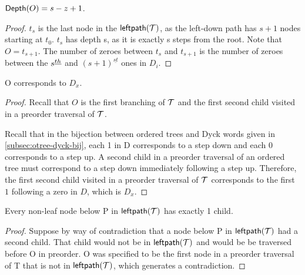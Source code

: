 \begin{remark} $\mathsf{Depth}{(O)}=s-z+1$. \label{re:o_depth_formula}
\end{remark} 
\begin{proof}


    $t_s$ is the last node in the $\mathsf{leftpath}{(\mathcal{\mathcal{T}})}$, as the left-down path has $s+1$ nodes starting at $t_0$. $t_s$ has depth s, as it is exactly s steps from the root.  Note that $O=t_{s+1}$.  The number of zeroes between $t_s$ and $t_{s+1}$ is the number of zeroes between the $s^{\underline{th}}$ and $(s+1)^{\underline{st}}$ ones in $D_i$.  

\end{proof} 
\begin{remark}O corresponds to $D_x$.
\end{remark}
\begin{proof}
    Recall that $O$ is the first branching of $\mathcal{T}$ and the first second child visited in a preorder traversal of $\mathcal{T}$.

    Recall that in the bijection between ordered trees and Dyck words given in \ref{subsec:otree-dyck-bij}, each 1 in D corresponds to a step down and each 0 corresponds to a step up.  A second child in a preorder traversal of an ordered tree must correspond to a step down immediately following a step up.  Therefore, the first second child visited in a preorder traversal of $\mathcal{T}$ corresponds to the first $1$ following a zero in $D$, which is $D_x$.

\end{proof}
\begin{remark} Every non-leaf node below P in $\mathsf{leftpath}{(\mathcal{\mathcal{T}})}$ has exactly 1 child.  \label{rem:left-is-path}
\end{remark}

\begin{proof}
    Suppose by way of contradiction that a node below P in $\mathsf{leftpath}{(\mathcal{\mathcal{T}})}$ had a second child. That child would not be in $\mathsf{leftpath}{(\mathcal{\mathcal{T}})}$ and would be be traversed before O in preorder. O was specified to be the first node in a preorder traversal of T that is not in $\mathsf{leftpath}{(\mathcal{\mathcal{T}})}$, which generates a contradiction.

\end{proof}

